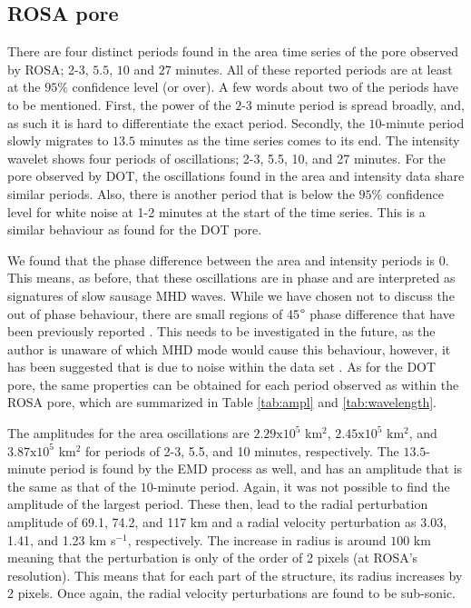     \subsection{ROSA pore}
    
    There are four distinct periods found in the area time series of the pore observed by ROSA; 2-3, $5.5$, $10$ and $27$ minutes.
    All of these reported periods are at least at the $95\%$ confidence level (or over).
    A few words about two of the periods have to be mentioned.
    First, the power of the $2$-$3$ minute period is spread broadly, and, as such it is hard to differentiate the exact period.
    Secondly, the $10$-minute period slowly migrates to $13.5$ minutes as the time series comes to its end.
    The intensity wavelet shows four periods of oscillations; 2-3, 5.5, 10, and 27 minutes.
    For the pore observed by DOT, the oscillations found in the area and intensity data share similar periods.
    Also, there is another period that is below the $95\%$ confidence level for white noise at 1-2 minutes at the start of the time series.
    This is a similar behaviour as found for the DOT pore.
    
    We found that the phase difference between the area and intensity periods is 0\degree.
    This means, as before, that these oscillations are in phase and are interpreted as signatures of slow sausage MHD waves.
    While we have chosen not to discuss the out of phase behaviour, there are small regions of 45$\degree$ phase difference that have been previously reported \citep{Dorotovic2014}.
    This needs to be investigated in the future, as the author is unaware of which MHD mode would cause this behaviour, however, it has been suggested that is due to noise within the data set \citep{2015A&A...579A..73M}.
    As for the DOT pore, the same properties can be obtained for each period observed as within the ROSA pore, which are summarized in Table \ref{tab:ampl} and \ref{tab:wavelength}.
    
	The amplitudes for the area oscillations are $2.29\mathrm{x}10^5$ km$^2$, $2.45\mathrm{x}10^5$ km$^2$, and $3.87\mathrm{x}10^5$ km$^2$ for periods of 2-3, 5.5, and 10 minutes, respectively.
	The $13.5$-minute period is found by the EMD process as well, and has an amplitude that is the same as that of the $10$-minute period. 
	Again, it was not possible to find the amplitude of the largest period.
	These then, lead to the radial perturbation amplitude of 69.1, 74.2, and 117 km and a radial velocity perturbation as 3.03, 1.41, and 1.23 km s$^{-1}$, respectively.
	The increase in radius is around $100$ km meaning that the perturbation is only of the order of 2 pixels (at ROSA's resolution).
	This means that for each part of the structure, its radius increases by 2 pixels.
	Once again, the radial velocity perturbations are found to be sub-sonic.
	
